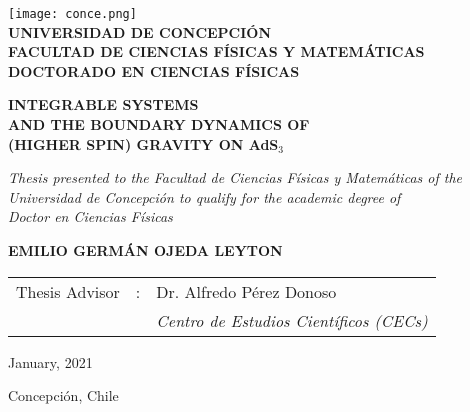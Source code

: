 \documentclass[letterpaper,11pt,oneside]{book}
\begin{document}

\thispagestyle{empty}

\begin{titlepage}
	\centering
	{\texttt{[image: conce.png]}\\
	\textbf{UNIVERSIDAD DE CONCEPCI\'ON} \\ 
	\textbf{FACULTAD DE CIENCIAS F\'ISICAS Y MATEM\'ATICAS} \\
	\textbf{DOCTORADO EN CIENCIAS F\'ISICAS} \par}
	\vspace{2cm}
	{\LARGE \textbf{INTEGRABLE SYSTEMS \\ AND THE BOUNDARY DYNAMICS OF \\ (HIGHER SPIN) GRAVITY ON AdS$_3$}  \par}	
	\vspace{1.7 cm}
	{\itshape \it Thesis presented to the Facultad de Ciencias F\'isicas y Matem\'aticas of the\\ Universidad de Concepci\'on to qualify for the academic degree of\\ Doctor en Ciencias F\'isicas \par}
    \vspace{1.7cm}
	{\Large \textbf{EMILIO GERM\'AN OJEDA LEYTON} \par}
	\vspace{1.7cm}
	\begin{flushright}
		\begin{tabular}[c]{lll}
			\large{Thesis Advisor} & : & \large{Dr. Alfredo P\'erez Donoso} \\
			& & \large{\textit{Centro de Estudios Cient\'ificos (CECs)}} \\
		\end{tabular} 
	\end{flushright} 
	\vspace{2cm}
	{\large January, 2021 \par}
	{\large Concepci\'on, Chile \par}
\end{titlepage}

\newpage
\restoregeometry


\end{document}

